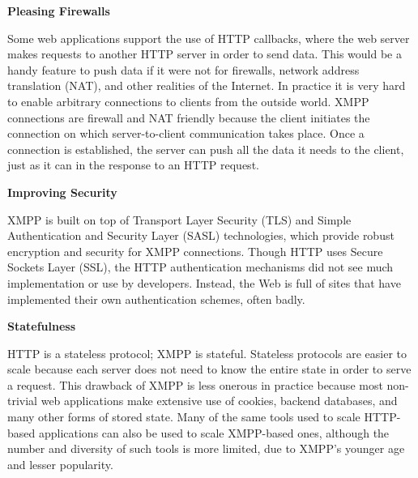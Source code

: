       \textbf{Pleasing Firewalls}

      Some web applications support the use of HTTP callbacks, where the web server makes requests to another HTTP server in order to send data. This would be a handy feature to push data if it were not for firewalls, network address translation (NAT), and other realities of the Internet. In practice it is very hard to enable arbitrary connections to clients from the outside world. XMPP connections are firewall and NAT friendly because the client initiates the connection on which server-to-client communication takes place. Once a connection is established, the server can push all the data it needs to the client, just as it can in the response to an HTTP request.
      
      \textbf{Improving Security}

      XMPP is built on top of Transport Layer Security (TLS) and Simple Authentication and Security Layer (SASL) technologies, which provide robust encryption and security for XMPP connections. Though HTTP uses Secure Sockets Layer (SSL), the HTTP authentication mechanisms did not see much implementation or use by developers. Instead, the Web is full of sites that have implemented their own authentication schemes, often badly.
      
      \textbf{Statefulness}

      HTTP is a stateless protocol; XMPP is stateful. Stateless protocols are easier to scale because each server does not need to know the entire state in order to serve a request. This drawback of XMPP is less onerous in practice because most non-trivial web applications make extensive use of cookies, backend databases, and many other forms of stored state. Many of the same tools used to scale HTTP-based applications can also be used to scale XMPP-based ones, although the number and diversity of such tools is more limited, due to XMPP’s younger age and lesser popularity.

